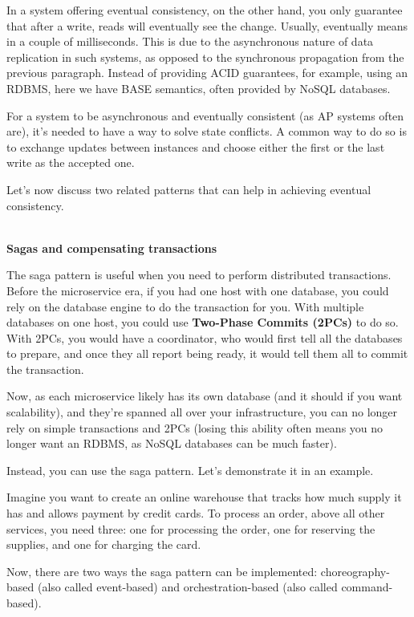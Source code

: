 In a system offering eventual consistency, on the other hand, you only guarantee that after a write, reads will eventually see the change. Usually, eventually means in a couple of milliseconds. This is due to the asynchronous nature of data replication in such systems, as opposed to the synchronous propagation from the previous paragraph. Instead of providing ACID guarantees, for example, using an RDBMS, here we have BASE semantics, often provided by NoSQL databases.

For a system to be asynchronous and eventually consistent (as AP systems often are), it's needed to have a way to solve state conflicts. A common way to do so is to exchange updates between instances and choose either the first or the last write as the accepted one.

Let's now discuss two related patterns that can help in achieving eventual consistency.


\hspace*{\fill} \\ %
\noindent
\textbf{Sagas and compensating transactions}

The saga pattern is useful when you need to perform distributed transactions. Before the microservice era, if you had one host with one database, you could rely on the database engine to do the transaction for you. With multiple databases on one host, you  could use\textbf{ Two-Phase Commits (2PCs)} to do so. With 2PCs, you would have a coordinator, who would first tell all the databases to prepare, and once they all report being ready, it would tell them all to commit the transaction.

Now, as each microservice likely has its own database (and it should if you want scalability), and they're spanned all over your infrastructure, you can no longer rely on simple transactions and 2PCs (losing this ability often means you no longer want an RDBMS, as NoSQL databases can be much faster).

Instead, you can use the saga pattern. Let's demonstrate it in an example.

Imagine you want to create an online warehouse that tracks how much supply it has and allows payment by credit cards. To process an order, above all other services, you need three: one for processing the order, one for reserving the supplies, and one for charging the card.

Now, there are two ways the saga pattern can be implemented: choreography-based (also called event-based) and orchestration-based (also called command-based).


